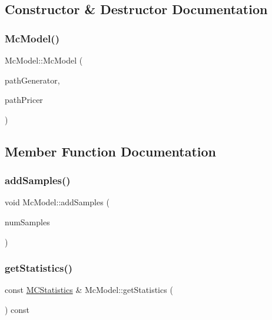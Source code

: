 \subsection{Constructor \& Destructor Documentation}
\hypertarget{class_mc_model_ac8cfd885b4baeabe5c20ad56ce1803f0}{}\label{class_mc_model_ac8cfd885b4baeabe5c20ad56ce1803f0} 
\subsubsection{\texorpdfstring{Mc\+Model()}{McModel()}}
{\footnotesize\ttfamily Mc\+Model\+::\+Mc\+Model (\begin{DoxyParamCaption}\item[{const std\+::shared\+\_\+ptr$<$ \hyperlink{class_path_generator}{Path\+Generator}$<$ \hyperlink{class_normal_marsaglia_bray_rng}{Normal\+Marsaglia\+Bray\+Rng}$<$ \hyperlink{class_uniform_l_ecuyer_r_n_g1}{Uniform\+L\+Ecuyer\+R\+N\+G1} $>$ $>$ $>$ \&}]{path\+Generator,  }\item[{const std\+::shared\+\_\+ptr$<$ \hyperlink{class_path_pricer}{Path\+Pricer} $>$}]{path\+Pricer }\end{DoxyParamCaption})}



\subsection{Member Function Documentation}
\hypertarget{class_mc_model_a81f56ed90c002927bdec595eb52c57c3}{}\label{class_mc_model_a81f56ed90c002927bdec595eb52c57c3} 
\subsubsection{\texorpdfstring{add\+Samples()}{addSamples()}}
{\footnotesize\ttfamily void Mc\+Model\+::add\+Samples (\begin{DoxyParamCaption}\item[{unsigned long}]{num\+Samples }\end{DoxyParamCaption})}

\hypertarget{class_mc_model_afc977c490efd468506d7436901a72177}{}\label{class_mc_model_afc977c490efd468506d7436901a72177} 
\subsubsection{\texorpdfstring{get\+Statistics()}{getStatistics()}}
{\footnotesize\ttfamily const \hyperlink{class_m_c_statistics}{M\+C\+Statistics} \& Mc\+Model\+::get\+Statistics (\begin{DoxyParamCaption}{ }\end{DoxyParamCaption}) const}



